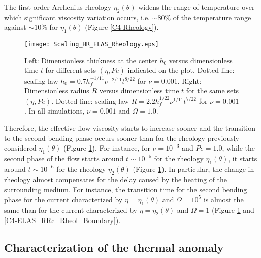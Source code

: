 The first  order Arrhenius rheology $\eta_2(\theta)$  widens the range
of temperature over which significant viscosity variation occurs, i.e.
$\sim80\%$   of  the   temperature   range   against  $\sim10\%$   for
$\eta_1(\theta)$ (Figure \ref{C4-Rheology}).

\begin{figure}[htpb]
  \begin{center}
    \graphicspath{ {/Users/thorey/Documents/These/Projet/Refroidissement/Skin_Model/Figure/Figure_Heating/} }
    \texttt{[image: Scaling\_HR\_ELAS\_Rheology.eps]}
    \caption{Left: Dimensionless thickness at  the center $h_0$ versus
      dimensionless time $t$ for  different sets $(\eta,Pe)$ indicated
      on      the      plot.        Dotted-line:      scaling      law
      $h_0=  0.7h_f^{-1/11}\nu^{-2/11}t^{8/22}$  for  $\nu  =  0.001$.
      Right: Dimensionless  radius $R$  versus dimensionless  time $t$
      for  the  same  sets   $(\eta,Pe)$.   Dotted-line:  scaling  law
      $R=  2.2h_f^{1/22}\nu^{1/11}t^{7/22}$ for  $\nu=0.001$.  In  all
      simulations, $\nu=0.001$ and $\Omega=1.0$.}
    \label{C4-Scaling_HR_ELAS_Rheology}
  \end{center}
\end{figure}

Therefore, the effective flow viscosity  starts to increase sooner and
the transition to the second bending  phase occurs sooner than for the
rheology     previously     considered    $\eta_1(\theta)$     (Figure
\ref{C4-Scaling_HR_ELAS_Rheology}).   For instance,  for $\nu=10^{-3}$
and  $Pe=1.0$,  while the  second  phase  of  the flow  starts  around
$t\sim 10^{-5}$  for the  rheology $\eta_1(\theta)$, it  starts around
$t\sim   10^{-6}$   for    the   rheology   $\eta_2(\theta)$   (Figure
\ref{C4-Scaling_HR_ELAS_Rheology}).   In  particular,  the  change  in
rheology almost compensates for the delay caused by the heating of the
surrounding medium. For  instance, the transition time  for the second
bending phase  for the current characterized  by $\eta=\eta_1(\theta)$
and  $\Omega=10^5$   is  almost   the  same   than  for   the  current
characterized   by   $\eta=\eta_2(\theta)$  and   $\Omega=1$   (Figure
\ref{C4-Scaling_HR_ELAS_Rheology}                                  and
\ref{C4-ELAS_RRc_Rheol_Boundary}).

\subsection{Characterization of the thermal anomaly}
\label{C4-sec:char-therm-anom}

